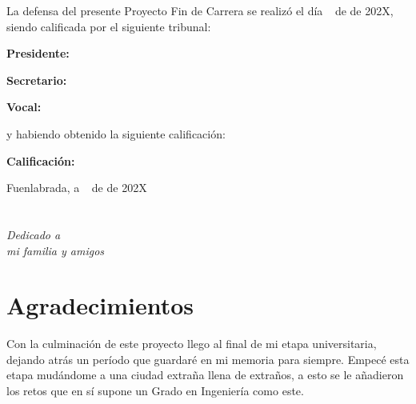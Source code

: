 \documentclass[a4paper, 12pt]{book}
\begin{document}
\vspace{1cm}
La defensa del presente Proyecto Fin de Carrera se realizó el día \qquad$\;\,$ de \qquad\qquad\qquad\qquad \newline de 202X, siendo calificada por el siguiente tribunal:


\vspace{0.5cm}
\textbf{Presidente:}

\vspace{1.2cm}
\textbf{Secretario:}

\vspace{1.2cm}
\textbf{Vocal:}


\vspace{1.2cm}
y habiendo obtenido la siguiente calificación:

\vspace{1cm}
\textbf{Calificación:}


\vspace{1cm}
\begin{flushright}
Fuenlabrada, a \qquad$\;\,$ de \qquad\qquad\qquad\qquad de 202X
\end{flushright}


\chapter*{}
\begin{flushright}
\textit{Dedicado a \\
mi familia y amigos}
\end{flushright}


\chapter*{Agradecimientos}

Con la culminación de este proyecto llego al final de mi etapa universitaria, dejando atrás un período que guardaré en mi memoria para siempre.
Empecé esta etapa mudándome a una ciudad extraña llena de extraños, a esto se le añadieron los retos que en sí supone un Grado en Ingeniería como este.
\end{document}
